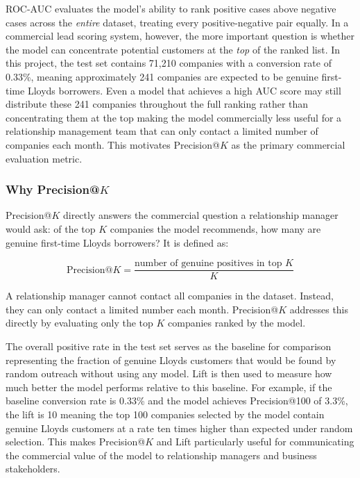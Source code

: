 \documentclass[ %
                    author={Natchalin Iwsakul \\[0.4em] Inkaphol Siriwongwattana \\[0.4em] Tanaphan Kummaraphat \\[0.6em] Patorn Srisupap},,
                supervisor={Fernando Moreno-Pino},
                    degree={MSc},
                     title={Propensity Modelling for SME Commercial Lending Using Open Public Data
},
                  subtitle={Companies House and GDELT as predictors of first-time borrowing},
                      type={},
                      year={2026}]{dissertation}
\begin{document}
ROC-AUC evaluates the model's ability to rank positive cases
above negative cases across the \emph{entire} dataset,
treating every positive-negative pair equally. In a
commercial lead scoring system, however, the more important
question is whether the model can concentrate potential
customers at the \emph{top} of the ranked list. In this
project, the test set contains 71,210 companies with a
conversion rate of 0.33\%, meaning approximately 241
companies are expected to be genuine first-time Lloyds
borrowers. Even a model that achieves a high AUC score may
still distribute these 241 companies throughout the full
ranking rather than concentrating them at the top making
the model commercially less useful for a relationship
management team that can only contact a limited number of
companies each month. This motivates Precision@$K$ as the
primary commercial evaluation metric.

\subsubsection{Why Precision@$K$}

Precision@$K$ directly answers the commercial question a
relationship manager would ask: of the top $K$ companies
the model recommends, how many are genuine first-time
Lloyds borrowers? It is defined as:

\begin{equation}
    \text{Precision@}K =
    \frac{\text{number of genuine positives in top } K}{K}
    \label{eq:pak}
\end{equation}

\noindent
A relationship manager cannot contact all companies in the
dataset. Instead, they can only contact a limited number
each month. Precision@$K$ addresses this directly by
evaluating only the top $K$ companies ranked by the model.

The overall positive rate in the test set serves as the
baseline for comparison representing the fraction of
genuine Lloyds customers that would be found by random
outreach without using any model. Lift is then used to
measure how much better the model performs relative to this
baseline. For example, if the baseline conversion rate is
0.33\% and the model achieves Precision@100 of 3.3\%, the
lift is 10  meaning the top 100 companies selected by the
model contain genuine Lloyds customers at a rate ten times
higher than expected under random selection. This makes
Precision@$K$ and Lift particularly useful for communicating
the commercial value of the model to relationship managers
and business stakeholders.
\end{document}
